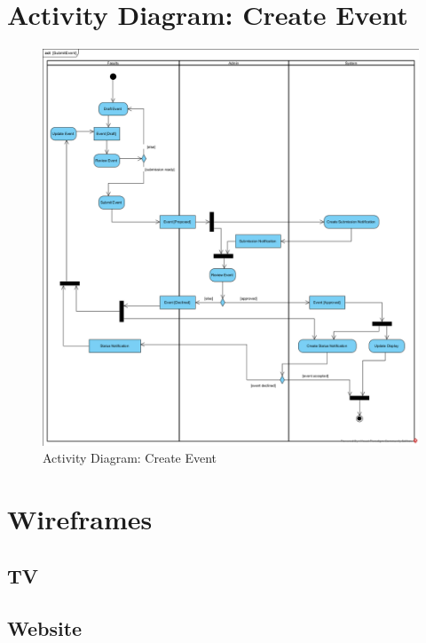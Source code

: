 \documentclass{article}
\begin{document}
\section{Activity Diagram: Create Event}
\begin{figure}[H]
    \centering
    \includegraphics[width=.98\textwidth]{images/SubmitEvent.png}
    \centering
    \caption{Activity Diagram: Create Event}
    \label{fig:activityDiagram}
\end{figure}

\section{Wireframes}
\subsection{TV}

\subsection{Website}
\end{document}
